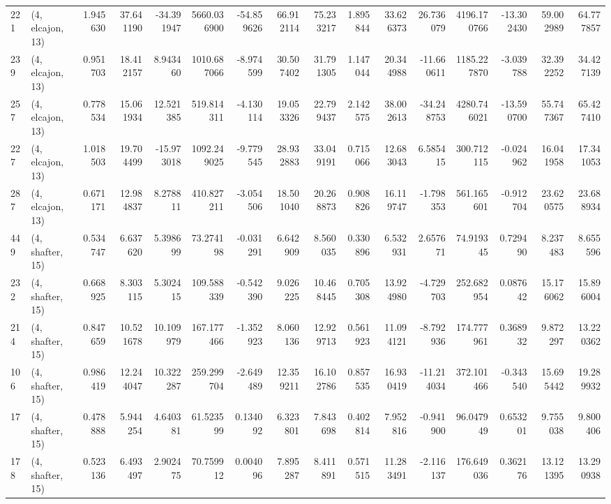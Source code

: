 \begin{tabular}{llrrrrrrrrrrrrrr}
221 &  (4, elcajon, 13) &   1.945630 &  37.641190 & -34.391947 &  5660.036900 & -54.859626 &  66.912114 &  75.233217 &  1.895844 &  33.626373 &  26.736079 &  4196.170766 & -13.302430 &  59.002989 &  64.777857 \\
239 &  (4, elcajon, 13) &   0.951703 &  18.412157 &   8.943460 &  1010.687066 &  -8.974599 &  30.507402 &  31.791305 &  1.147044 &  20.344988 & -11.660611 &  1185.227870 &  -3.039788 &  32.392252 &  34.427139 \\
257 &  (4, elcajon, 13) &   0.778534 &  15.061934 &  12.521385 &   519.814311 &  -4.130114 &  19.053326 &  22.799437 &  2.142575 &  38.002613 & -34.248753 &  4280.746021 & -13.590700 &  55.747367 &  65.427410 \\
227 &  (4, elcajon, 13) &   1.018503 &  19.704499 & -15.973018 &  1092.249025 &  -9.779545 &  28.932883 &  33.049191 &  0.715066 &  12.683043 &   6.585415 &   300.712115 &  -0.024962 &  16.041958 &  17.341053 \\
287 &  (4, elcajon, 13) &   0.671171 &  12.984837 &   8.278811 &   410.827211 &  -3.054506 &  18.501040 &  20.268873 &  0.908826 &  16.119747 &  -1.798353 &   561.165601 &  -0.912704 &  23.620575 &  23.688934 \\
449 &  (4, shafter, 15) &   0.534747 &   6.637620 &   5.398699 &    73.274198 &  -0.031291 &   6.642909 &   8.560035 &  0.330896 &   6.532931 &   2.657671 &    74.919345 &   0.729490 &   8.237483 &   8.655596 \\
232 &  (4, shafter, 15) &   0.668925 &   8.303115 &   5.302415 &   109.588339 &  -0.542390 &   9.026225 &  10.468445 &  0.705308 &  13.924980 &  -4.729703 &   252.682954 &   0.087642 &  15.176062 &  15.896004 \\
214 &  (4, shafter, 15) &   0.847659 &  10.521678 &  10.109979 &   167.177466 &  -1.352923 &   8.060136 &  12.929713 &  0.561923 &  11.094121 &  -8.792936 &   174.777961 &   0.368932 &   9.872297 &  13.220362 \\
106 &  (4, shafter, 15) &   0.986419 &  12.244047 &  10.322287 &   259.299704 &  -2.649489 &  12.359211 &  16.102786 &  0.857535 &  16.930419 & -11.214034 &   372.101466 &  -0.343540 &  15.695442 &  19.289932 \\
17  &  (4, shafter, 15) &   0.478888 &   5.944254 &   4.640381 &    61.523599 &   0.134092 &   6.323801 &   7.843698 &  0.402814 &   7.952816 &  -0.941900 &    96.047949 &   0.653201 &   9.755038 &   9.800406 \\
178 &  (4, shafter, 15) &   0.523136 &   6.493497 &   2.902475 &    70.759912 &   0.004096 &   7.895287 &   8.411891 &  0.571515 &  11.283491 &  -2.116137 &   176.649036 &   0.362176 &  13.121395 &  13.290938 \\

\end{tabular}
